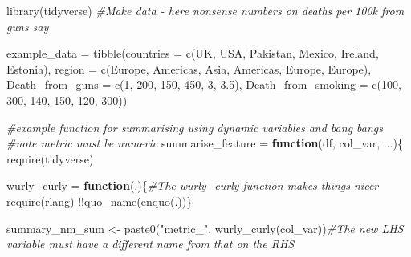 \documentclass[
]{book}
\newenvironment{Shaded}{\begin{snugshade}}{\end{snugshade}}
\newcommand{\AttributeTok}[1]{\textcolor[rgb]{0.77,0.63,0.00}{#1}}
\newcommand{\CommentTok}[1]{\textcolor[rgb]{0.56,0.35,0.01}{\textit{#1}}}
\newcommand{\ControlFlowTok}[1]{\textcolor[rgb]{0.13,0.29,0.53}{\textbf{#1}}}
\newcommand{\DecValTok}[1]{\textcolor[rgb]{0.00,0.00,0.81}{#1}}
\newcommand{\FloatTok}[1]{\textcolor[rgb]{0.00,0.00,0.81}{#1}}
\newcommand{\FunctionTok}[1]{\textcolor[rgb]{0.00,0.00,0.00}{#1}}
\newcommand{\NormalTok}[1]{#1}
\newcommand{\OtherTok}[1]{\textcolor[rgb]{0.56,0.35,0.01}{#1}}
\newcommand{\SpecialCharTok}[1]{\textcolor[rgb]{0.00,0.00,0.00}{#1}}
\newcommand{\StringTok}[1]{\textcolor[rgb]{0.31,0.60,0.02}{#1}}
\begin{document}
\begin{Shaded}
\begin{Highlighting}[]
\FunctionTok{library}\NormalTok{(tidyverse)}
\CommentTok{\#Make data {-} here nonsense numbers on deaths per 100k from guns say}

\NormalTok{example\_data }\OtherTok{=} \FunctionTok{tibble}\NormalTok{(}\AttributeTok{countries =} \FunctionTok{c}\NormalTok{(}\StringTok{\textquotesingle{}UK\textquotesingle{}}\NormalTok{, }\StringTok{\textquotesingle{}USA\textquotesingle{}}\NormalTok{, }\StringTok{\textquotesingle{}Pakistan\textquotesingle{}}\NormalTok{, }\StringTok{\textquotesingle{}Mexico\textquotesingle{}}\NormalTok{, }\StringTok{\textquotesingle{}Ireland\textquotesingle{}}\NormalTok{, }\StringTok{\textquotesingle{}Estonia\textquotesingle{}}\NormalTok{),}
                      \AttributeTok{region =} \FunctionTok{c}\NormalTok{(}\StringTok{\textquotesingle{}Europe\textquotesingle{}}\NormalTok{, }\StringTok{\textquotesingle{}Americas\textquotesingle{}}\NormalTok{, }\StringTok{\textquotesingle{}Asia\textquotesingle{}}\NormalTok{, }\StringTok{\textquotesingle{}Americas\textquotesingle{}}\NormalTok{, }\StringTok{\textquotesingle{}Europe\textquotesingle{}}\NormalTok{, }\StringTok{\textquotesingle{}Europe\textquotesingle{}}\NormalTok{),}
                      \AttributeTok{Death\_from\_guns =} \FunctionTok{c}\NormalTok{(}\DecValTok{1}\NormalTok{, }\DecValTok{200}\NormalTok{, }\DecValTok{150}\NormalTok{, }\DecValTok{450}\NormalTok{, }\DecValTok{3}\NormalTok{, }\FloatTok{3.5}\NormalTok{),}
                      \AttributeTok{Death\_from\_smoking =} \FunctionTok{c}\NormalTok{(}\DecValTok{100}\NormalTok{, }\DecValTok{300}\NormalTok{, }\DecValTok{140}\NormalTok{, }\DecValTok{150}\NormalTok{, }\DecValTok{120}\NormalTok{, }\DecValTok{300}\NormalTok{))}


\CommentTok{\#example function for summarising using dynamic variables and bang bangs}
\CommentTok{\#note metric must be numeric}
\NormalTok{summarise\_feature }\OtherTok{=} \ControlFlowTok{function}\NormalTok{(df, col\_var, ...)\{}
  \FunctionTok{require}\NormalTok{(tidyverse)}
  
\NormalTok{  wurly\_curly }\OtherTok{=} \ControlFlowTok{function}\NormalTok{(.)\{}\CommentTok{\#The wurly\_curly function makes things nicer}
  \FunctionTok{require}\NormalTok{(rlang)}
  \SpecialCharTok{!!}\FunctionTok{quo\_name}\NormalTok{(}\FunctionTok{enquo}\NormalTok{(.))\}}

\NormalTok{  summary\_nm\_sum }\OtherTok{\textless{}{-}} \FunctionTok{paste0}\NormalTok{(}\StringTok{"metric\_"}\NormalTok{, }\FunctionTok{wurly\_curly}\NormalTok{(col\_var))}\CommentTok{\#The new LHS variable must have a different name from that on the RHS}


\end{Highlighting}
\end{Shaded}
\end{document}
